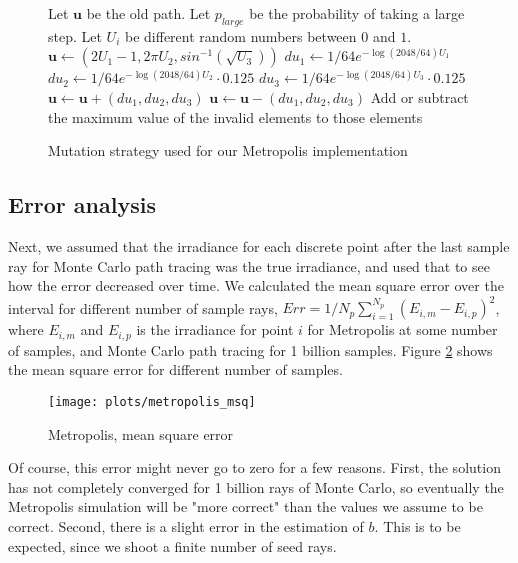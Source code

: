 \begin{figure}[h]
\begin{algorithmic}
\STATE Let $\mathbf{u}$ be the old path.
\STATE Let $p_{large}$ be the probability of taking a large step.
\STATE Let $U_i$ be different random numbers between $0$ and $1$. 
    \STATE $\mathbf{u} \gets \left( 2U_1-1, 2\pi U_2, sin^{-1}(\sqrt{U_3})\right)$
\ELSE
    \STATE $du_1 \gets 1/64 e^{-\log(2048/64)U_1}$
    \STATE $du_2 \gets 1/64 e^{-\log(2048/64)U_2}\cdot 0.125$
    \STATE $du_3 \gets 1/64 e^{-\log(2048/64)U_3}\cdot 0.125$
        \STATE $\mathbf{u} \gets \mathbf{u} + (du_1, du_2, du_3)$
    \ELSE
        \STATE $\mathbf{u} \gets \mathbf{u} - (du_1, du_2, du_3)$
    \ENDIF
        \STATE Add or subtract the maximum value of the invalid elements to those elements
    \ENDIF
\ENDIF
\end{algorithmic}
\caption{Mutation strategy used for our Metropolis implementation}
\label{fig:mutation_metropolis}
\end{figure}

\subsection*{Error analysis}
Next, we assumed that the irradiance for each discrete point after the last sample ray for Monte Carlo path tracing was the true irradiance, and used that to see how the error decreased over time. We calculated the mean square error over the interval for different number of sample rays, $Err = 1/N_p \sum_{i=1}^{N_p} (E_{i,m} - E_{i,p})^2$, where $E_{i,m}$ and $E_{i,p}$ is the irradiance for point $i$ for Metropolis at some number of samples, and Monte Carlo path tracing for 1 billion samples. Figure \ref{fig:metropolis_msq} shows the mean square error for different number of samples.

\begin{figure}
    \centering
    \texttt{[image: plots/metropolis\_msq]}\\
    \caption{Metropolis, mean square error}
    \label{fig:metropolis_msq}
\end{figure}

Of course, this error might never go to zero for a few reasons. First, the solution has not completely converged for 1 billion rays of Monte Carlo, so eventually the Metropolis simulation will be "more correct" than the values we assume to be correct. Second, there is a slight error in the estimation of $b$. This is to be expected, since we shoot a finite number of seed rays.

